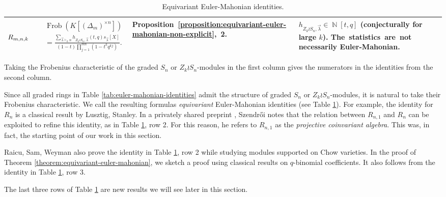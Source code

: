 \documentclass[a4paper,12pt]{amsart}
\theoremstyle{plain}
\theoremstyle{definition}
\theoremstyle{remark}
\DeclareMathOperator{\NN}{\mathbb{N}}
\DeclareMathOperator{\Frob}{Frob}
\begin{document}
\begin{table}[H]
\begin{tabular}{ | p{15mm} | l | p{32mm} |p{35mm}|}
\hline
$\rule{0em}{2.8em} R_{m, n, k}$ & $\begin{aligned}
    &\Frob\left(K[(\Delta_m)^{\times n}]\right) \\
    &= \frac{\sum_{\vec{\lambda} \vdash_k n} h_{Z_k \wr S_n, \vec{\lambda}}(t, q) s_{\vec{\lambda}}[X]}{(1 - t)\prod_{j = 1}^{mn} (1 - t^kq^{kj})}.
\end{aligned}$ & Proposition~\ref{proposition:equivariant-euler-mahonian-non-explicit},~2. & $h_{Z_k \wr S_n, \vec{\lambda}} \in \NN[t, q]$ (conjecturally for large $k$). The~statistics~are~not necessarily Euler-Mahonian. \\[.4 em]
\hline
\end{tabular}
\caption{Equivariant Euler-Mahonian identities.} \normalsize{Taking the Frobenius characteristic of the graded $S_n$ or $Z_k \wr S_n$-modules in the first column gives the numerators in the identities from the second column.}
\label{tab:equivariant-euler-mahonian-identities}
\end{table}

Since all graded rings in Table \ref{tab:euler-mahonian-identities} admit the structure of graded $S_n$ or $Z_k \wr S_n$-modules, it is natural to take their Frobenius characteristic. We call the resulting formulas \emph{equivariant} Euler-Mahonian identities (see Table \ref{tab:equivariant-euler-mahonian-identities}). For example, the identity for $R_n$ is a classical result by Lusztig, Stanley. In a privately shared preprint \cite{szendroi-projective}, Szendrői notes that the relation between $R_{n, 1}$ and $R_n$ can be exploited to refine this identity, as in Table \ref{tab:equivariant-euler-mahonian-identities}, row 2. For this reason, he refers to $R_{n, 1}$ as the \emph{projective coinvariant algebra}. This was, in fact, the starting point of our work in this section.

Raicu, Sam, Weyman \cite{raicu-sam-weyman-modules} also prove the identity in Table \ref{tab:equivariant-euler-mahonian-identities}, row 2 while studying modules supported on Chow varieties. In the proof of Theorem \ref{theorem:equivariant-euler-mahonian}, we sketch a proof using classical results on $q$-binomial coefficients. It also follows from the identity in Table \ref{tab:equivariant-euler-mahonian-identities}, row 3. 

The last three rows of Table \ref{tab:equivariant-euler-mahonian-identities} are new results we will see later in this section.
\end{document}
